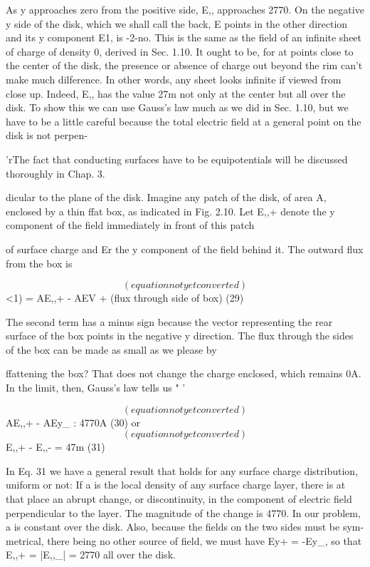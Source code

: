 As y approaches zero from the positive side, E,, approaches 2770.
On the negative y side of the disk, which we shall call the back, E
points in the other direction and its y component E1, is -2-no. This
is the same as the field of an infinite sheet of charge of density 0,
derived in Sec. 1.10. It ought to be, for at points close to the center
of the disk, the presence or absence of charge out beyond the rim
can't make much dilference. In other words, any sheet looks infinite
if viewed from close up. Indeed, E,, has the value 27m not only at the
center but all over the disk. To show this we can use Gauss's law
much as we did in Sec. 1.10, but we have to be a little careful because
the total electric field at a general point on the disk is not perpen-

'rThe fact that conducting surfaces have to be equipotentials will be discussed
thoroughly in Chap. 3.

dicular to the plane of the disk. Imagine any patch of the disk, of
area A, enclosed by a thin ffat box, as indicated in Fig. 2.10. Let E,,+
denote the y component of the field immediately in front of this patch

of surface charge and Er the y component of the field behind it. The
outward flux from the box is

\begin{equation}
(equation not yet converted)
\end{equation}
<1) = AE,,+ - AEV + (flux through side of box) (29)

The second term has a minus sign because the vector representing the
rear surface of the box points in the negative y direction. The flux
through the sides of the box can be made as small as we please by

ffattening the box? That does not change the charge enclosed, which
remains 0A. In the limit, then, Gauss's law tells us " '

\begin{equation}
(equation not yet converted)
\end{equation}
AE,,+ - AEy_ : 4770A (30)
or
\begin{equation}
(equation not yet converted)
\end{equation}
E,,+ - E,,- = 47m (31)

In Eq. 31 we have a general result that holds for any surface charge
distribution, uniform or not: If a is the local density of any surface
charge layer, there is at that place an abrupt change, or discontinuity,
in the component of electric field perpendicular to the layer. The
magnitude of the change is 4770. In our problem, a is constant over
the disk. Also, because the fields on the two sides must be sym-
metrical, there being no other source of field, we must have
Ey+ = -Ey_, so that E,,+ = |E,,_| = 2770 all over the disk.

